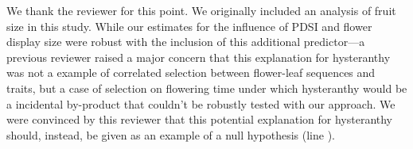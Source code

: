 \documentclass{article}[12pt]
\begin{document}
We thank the reviewer for this point. We originally included an analysis of fruit size in this study. While our estimates for the influence of PDSI and flower display size were robust with the inclusion of this additional predictor---a previous reviewer raised a major concern that this explanation for hysteranthy was not a example of correlated selection between flower-leaf sequences and traits, but a case of selection on flowering time under which hysteranthy would be a incidental by-product that couldn't be robustly tested with our approach. We were convinced by this reviewer that this potential explanation for hysteranthy should, instead, be given as an example of a null hypothesis (line ). %

 
\end{document}
